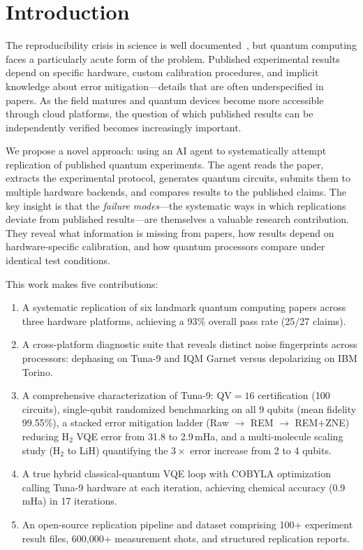 \documentclass[twocolumn,prl,superscriptaddress,nofootinbib]{revtex4-2}
\begin{document}
\section{Introduction}
\label{sec:intro}

The reproducibility crisis in science is well documented~\cite{baker2016}, but quantum computing faces a particularly acute form of the problem.
Published experimental results depend on specific hardware, custom calibration procedures, and implicit knowledge about error mitigation---details that are often underspecified in papers.
As the field matures and quantum devices become more accessible through cloud platforms, the question of which published results can be independently verified becomes increasingly important.

We propose a novel approach: using an AI agent to systematically attempt replication of published quantum experiments.
The agent reads the paper, extracts the experimental protocol, generates quantum circuits, submits them to multiple hardware backends, and compares results to the published claims.
The key insight is that the \emph{failure modes}---the systematic ways in which replications deviate from published results---are themselves a valuable research contribution.
They reveal what information is missing from papers, how results depend on hardware-specific calibration, and how quantum processors compare under identical test conditions.

This work makes five contributions:
\begin{enumerate}
  \item A systematic replication of six landmark quantum computing papers across three hardware platforms, achieving a 93\% overall pass rate (25/27 claims).
  \item A cross-platform diagnostic suite that reveals distinct noise fingerprints across processors: dephasing on Tuna-9 and IQM Garnet versus depolarizing on IBM Torino.
  \item A comprehensive characterization of Tuna-9: QV${}=16$ certification (100 circuits), single-qubit randomized benchmarking on all 9 qubits (mean fidelity 99.55\%), a stacked error mitigation ladder (Raw $\to$ REM $\to$ REM+ZNE) reducing H$_2$ VQE error from 31.8 to 2.9\,mHa, and a multi-molecule scaling study (H$_2$ to LiH) quantifying the $3\times$ error increase from 2 to 4 qubits.
  \item A true hybrid classical-quantum VQE loop with COBYLA optimization calling Tuna-9 hardware at each iteration, achieving chemical accuracy (0.9\,mHa) in 17 iterations.
  \item An open-source replication pipeline and dataset comprising 100+ experiment result files, 600{,}000+ measurement shots, and structured replication reports.
\end{enumerate}
\end{document}
